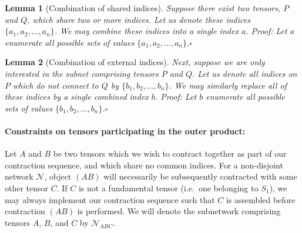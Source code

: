 \documentclass[aps,pre,reprint,superscriptaddress,amsfonts,amsmath,showpacs,nofootinbib,floatfix]{revtex4-1}
\newcommand{\mc}[1]{\mathcal{#1}}
\newcommand{\fuse}[2]{(#1#2)} %
\newtheorem{lemma}{Lemma}
\begin{document}
\begin{lemma}[Combination of shared indices]
Suppose there exist two tensors, $P$ and $Q$, which share two or more indices. Let us denote these indices $\{a_1,a_2,\ldots,a_n\}$. We may combine these indices into a single index $a$. \emph{Proof:} Let $a$ enumerate all possible sets of values %
$\{a_1,a_2,\ldots,a_n\}$.\hfill$\square$\label{lemma:sharedindices}
\end{lemma}
\begin{lemma}[Combination of external indices]
Next, suppose we are only interested in the subnet comprising tensors $P$ and $Q$. Let us denote all indices on $P$ which do not connect to $Q$ by $\{b_1,b_2,\ldots,b_n\}$. We may similarly replace all of these indices by a single combined index $b$. \emph{Proof:} Let $b$ %
enumerate all possible sets of values $\{b_1,b_2,\ldots,b_n\}$.\hfill$\square$\label{lemma:extindices}
\end{lemma}

\paragraph{Constraints on tensors participating in the outer product:\label{sec:tensorsinOP}}
Let $A$ and $B$ be two tensors which we wish to contract together as part of our contraction sequence, and which share no common indices. For a non-disjoint network $\mc{N}$, 
object $\fuse{A}{B}$ will necessarily be subsequently contracted with some other tensor $C$. If $C$ is not a fundamental tensor (i.e.~one belonging to $S_1$), we may always implement our contraction sequence such that $C$ is assembled before contraction $\fuse{A}{B}$ is performed. We will denote the subnetwork comprising tensors $A$, $B$, and $C$ by $\mc{N}_{ABC}$.
\end{document}
